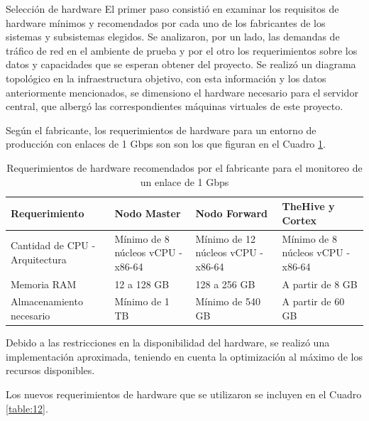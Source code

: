     
    \begin{section}{Selección de hardware}
    \label{seleccion_hw}
        El primer paso consistió en examinar los requisitos de hardware mínimos y recomendados por cada uno de los fabricantes de los sistemas y subsistemas elegidos. Se analizaron, por un lado, las demandas de tráfico de red en el ambiente de prueba y por el otro los requerimientos sobre los datos y capacidades que se esperan obtener del proyecto. Se realizó un diagrama topológico en la infraestructura objetivo, con esta información y los datos anteriormente mencionados, se dimensiono el hardware necesario para el servidor central, que albergó las correspondientes máquinas virtuales de este proyecto.\par
        Según el fabricante, los requerimientos de hardware para un entorno de producción con enlaces de 1 Gbps son son los que figuran en el Cuadro \ref{table:5}.
        
        \begin{table}[H]
        \centering
        \begin{tabular}{|m{9em}|m{9em}|m{9em}|m{9em}|}
        
            \hline 
                Requerimiento  & Nodo Master &  Nodo Forward & TheHive y Cortex \\ 
            \hline
                Cantidad de CPU - Arquitectura & Mínimo de 8 núcleos vCPU - x86-64 & Mínimo de 12 núcleos vCPU - x86-64 & Mínimo de 8 núcleos vCPU - x86-64 \\ 
            \hline
                Memoria RAM  & 12 a 128 GB & 128 a 256 GB & A partir de 8 GB \\ 
            \hline
                Almacenamiento necesario & Mínimo de 1 TB  & Mínimo de 540 GB & A partir de 60 GB \\
            \hline %
        \end{tabular}
        \caption{Requerimientos de hardware recomendados por el fabricante para el monitoreo de un enlace de 1 Gbps}
        \label{table:5}
        \end{table}
        
        Debido a las restricciones en la disponibilidad del hardware, se realizó una implementación aproximada, teniendo en cuenta la optimización al máximo de los recursos disponibles. \par
	    Los nuevos requerimientos de hardware que se utilizaron se incluyen en el Cuadro \ref{table:12}.

        \begin{table}[H]
        \centering
        \begin{tabular}{|m{9em}|m{9em}|m{9em}|m{9em}|}
        

\end{tabular}
\end{table}
\end{section}
